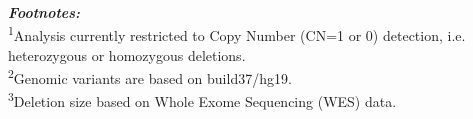 \\ \\ \\
\textbf{\textit{Footnotes:}}
\\
\textsuperscript{1}Analysis currently restricted to Copy Number (CN=1 or 0) detection, i.e. heterozygous or homozygous deletions.
\\
\textsuperscript{2}Genomic variants are based on build37/hg19.
\\
\textsuperscript{3}Deletion size based on Whole Exome Sequencing (WES) data. 
\\ \\ \\
